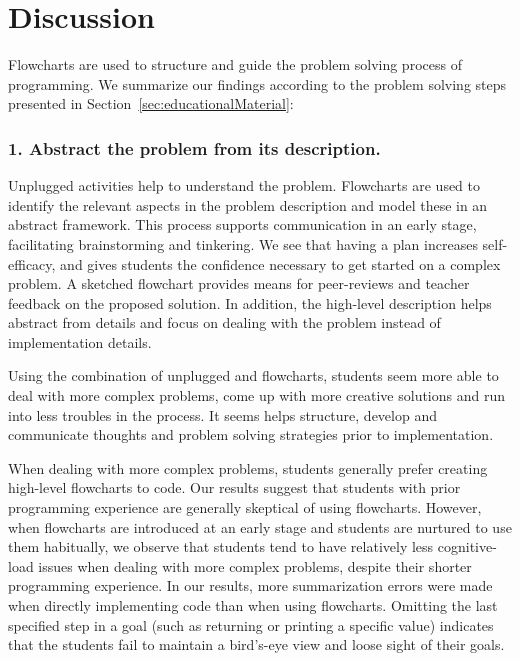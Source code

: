 
\section{Discussion}\label{sec:discussion}

Flowcharts are used to structure and guide the problem solving process of
programming. We summarize our findings according to the problem solving steps
presented in Section~\ref{sec:educationalMaterial}:

\subsubsection*{1. Abstract the problem from its description.}
    Unplugged activities help to understand the problem. Flowcharts are used to identify the relevant aspects in the problem description and model these in an abstract
    framework. This process supports communication in an early stage,
    facilitating brainstorming and tinkering. We see that having a
    plan increases self-efficacy, and gives students the confidence necessary to get started
    on a complex problem. A sketched flowchart
     provides means for peer-reviews and teacher feedback on the proposed
    solution. In addition, the high-level description helps abstract from
    details and focus on dealing with the problem instead of implementation details.

    Using the combination of unplugged and flowcharts, students seem more able to
    deal with more complex problems, come up with more creative solutions
    and run into less troubles in the process. It seems helps structure, develop
    and communicate thoughts and problem solving strategies prior to implementation.

    When dealing with more complex problems, students generally prefer
    creating high-level flowcharts to code. Our results suggest that students with
    prior programming experience are generally skeptical of using
    flowcharts. However, when flowcharts are introduced at an early stage
    and students are nurtured to use them habitually, we observe that
    students tend to have relatively less cognitive-load issues when
    dealing with more complex problems, despite their shorter programming
    experience. In our results, more summarization errors were made when directly
    implementing code than when using flowcharts. Omitting the last specified
    step in a goal (such as returning or printing a specific value)
    indicates that the students fail to maintain a bird's-eye view and
    loose sight of their goals.

